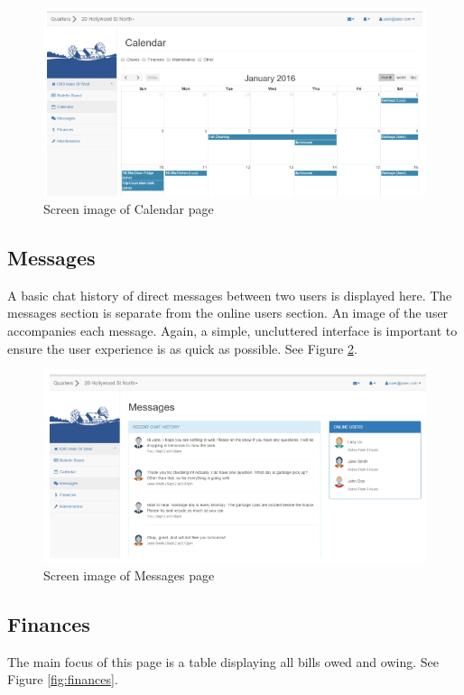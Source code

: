 \documentclass[12pt]{article}
\begin{document}
\begin{figure}
\centering
\includegraphics[width=\textwidth]{calendar}
\caption{Screen image of Calendar page}
\label{fig:calendar}
\end{figure}

\subsection{Messages}
A basic chat history of direct messages between two users is displayed here. The messages section is separate from the online users section. An image of the user accompanies each message. Again, a simple, uncluttered interface is important to ensure the user experience is as quick as possible. See Figure \ref{fig:messages}.

\begin{figure}
\centering
\includegraphics[width=\textwidth]{messages}
\caption{Screen image of Messages page}
\label{fig:messages}
\end{figure}

\subsection{Finances}
The main focus of this page is a table displaying all bills owed and owing. See Figure \ref{fig:finances}.
\end{document}
